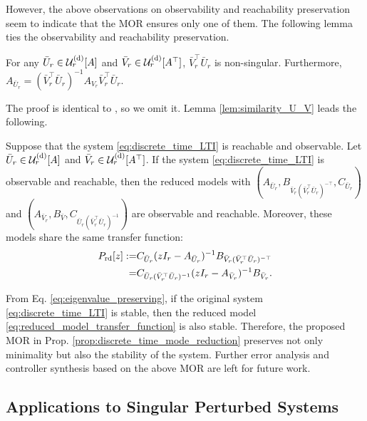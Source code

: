 \documentclass{ifacconf}
\begin{document}
However, the above observations on observability and reachability preservation seem to indicate that the MOR ensures only one of them. 
The following lemma ties the observability and reachability preservation. 
\begin{lem}\label{lem:similarity_U_V}
For any $\bar{U}_{r} \in \mathcal{U}_{r}^{\rm (d)} [A]$ and $\bar{V}_{r} \in \mathcal{U}_{r}^{\rm (d)}[A^{\top}]$, $\bar{V}_{r} ^{\top} \bar{U}_{r} $ is non-singular. Furthermore, $A_{\bar{U}_{r}} = (\bar{V}_{r} ^{\top} \bar{U}_{r} )^{-1} A_{V_{r}} \bar{V}_{r} ^{\top} \bar{U}_{r} $. 
\end{lem}
The proof is identical to \cite[Lemmas 19 and 20]{TsuzukiOhki2025global}, so we omit it. 
Lemma \ref{lem:similarity_U_V} leads the following. 
\begin{prop}\label{prop:discrete_time_mode_reduction}
Suppose that the system \eqref{eq:discrete_time_LTI} is reachable and observable.  
Let $\bar{U}_{r} \in \mathcal{U}_{r}^{\rm (d)} [A]$ and $\bar{V}_{r} \in \mathcal{U}_{r}^{\rm (d)}[A^{\top}]$. 
If the system \eqref{eq:discrete_time_LTI} is observable and reachable, then the reduced models with $(A_{\bar{U}_{r}}, B_{\bar{V}_{r}(\bar{V}_{r}^{\top}\bar{U}_{r})^{-\top}}, C_{\bar{U}_{r}})$ and $(A_{\bar{V}_{r}}, B_{\bar{V}}, C_{\bar{U}_{r}(\bar{V}_{r}^{\top}\bar{U}_{r})^{-1}})$ are observable and reachable.  
Moreover, these models share the same transfer function: 
\begin{align}
    P_{\rm rd}[z] :=& C_{\bar{U}_{r}} (zI_{r} - A_{\bar{U}_{r}}) ^{-1} B_{\bar{V}_{r}(\bar{V}_{r}^{\top}\bar{U}_{r})^{-\top}}
    \label{eq:reduced_model_transfer_function}
    \\
    =& 
    C_{\bar{U}_{r}(\bar{V}_{r}^{\top}\bar{U}_{r})^{-1}} (zI_{r} - A_{\bar{V}_{r}}) ^{-1} B_{\bar{V}_{r}}
    . \nonumber
\end{align}
\end{prop}
From Eq. \eqref{eq:eigenvalue_preserving}, if the original system \eqref{eq:discrete_time_LTI} is stable, then the reduced model \eqref{eq:reduced_model_transfer_function} is also stable. 
Therefore, the proposed MOR in Prop. \ref{prop:discrete_time_mode_reduction} preserves not only minimality but also the stability of the system. 
Further error analysis and controller synthesis based on the above MOR are left for future work. 


\subsection{Applications to Singular Perturbed Systems}
\end{document}
